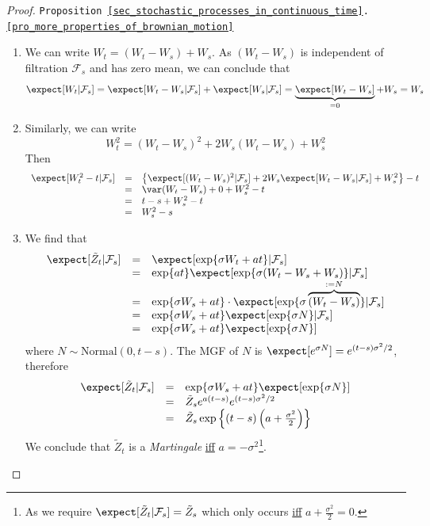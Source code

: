 \documentclass[11pt,a4paper]{article}
\begin{document}
  \begin{proof}{\texttt{Proposition \ref{sec_stochastic_processes_in_continuous_time}.\ref{pro_more_properties_of_brownian_motion}}}
    \begin{enumerate}
      \item We can write $W_t=(W_t-W_s)+W_s$. As $(W_t-W_s)$ is independent of filtration $\mathcal{F}_s$ and has zero mean, we can conclude that
      \[ \expect[W_t|\mathcal{F}_s]=\expect[W_t-W_s|\mathcal{F}_s]+\expect[W_s|\mathcal{F}_s]=\underbrace{\expect[W_t-W_s]}_{=0}+W_s=W_s \]
      \item Similarly, we can write
      \[ W_t^2=(W_t-W_s)^2+2W_s(W_t-W_s)+W_s^2 \]
      Then
      \[\begin{array}{rcl}
        \expect[W_t^2-t|\mathcal{F}_s]&=&\left\{\expect[(W_t-W_s)^2|\mathcal{F}_s]+2W_s\expect[W_t-W_s|\mathcal{F}_s]+W_s^2\right\}-t\\
        &=&\var(W_t-W_s)+0+W_s^2-t\\
        &=&t-s+W_s^2-t\\
        &=&W_s^2-s
      \end{array}\]
      \item We find that
      \[\begin{array}{rcl}
        \expect[\tilde{Z}_t|\mathcal{F}_s]&=&\expect[\exp\{\sigma W_t+at\}|\mathcal{F}_s]\\
        &=&\exp\{at\}\expect[\exp\{\sigma(W_t-W_s+W_s)\}|\mathcal{F}_s]\\
        &=&\exp\{\sigma W_s+at\}\cdot\expect[\exp\{\sigma\overbrace{(W_t-W_s)}^{:=N}\}|\mathcal{F}_s]\\
        &=&\exp\{\sigma W_s+at\}\expect[\exp\{\sigma N\}|\mathcal{F}_s]\\
        &=&\exp\{\sigma W_s+at\}\expect[\exp\{\sigma N\}]
      \end{array}\]
      where $N\sim\text{Normal}(0,t-s)$. The MGF of $N$ is $\expect[e^{\sigma N}]=e^{(t-s)\sigma^2/2}$, therefore
      \[\begin{array}{rcl}
        \expect[\tilde{Z}_t|\mathcal{F}_s]&=&\exp\{\sigma W_s+at\}\expect[\exp\{\sigma N\}]\\
        &=&\tilde{Z}_se^{a(t-s)}e^{(t-s)\sigma^2/2}\\
        &=&\tilde{Z}_s\exp\left\{(t-s)\left(a+\frac{\sigma^2}2\right)\right\}
      \end{array}\]
      We conclude that $\tilde{Z}_t$ is a \textit{Martingale} \underline{iff} $a=-\sigma^2$\footnote{As we require $\expect[\tilde{Z}_t|\mathcal{F}_s]=\tilde{Z}_s$ which only occurs \underline{iff} $a+\frac{\sigma^2}2=0$.}.
    \end{enumerate}
    \proved
  \end{proof}
\end{document}

